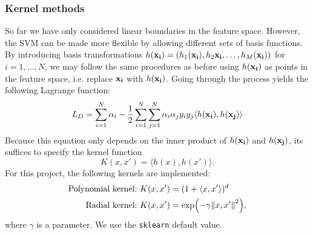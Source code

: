\documentclass[notitlepage, reprint, nofootinbib]{revtex4-1}
\begin{document}
\subsubsection{Kernel methods}
So far we have only considered linear boundaries in the feature space. However, the SVM can be made more flexible by allowing different sets of basis functions. By introducing basis transformations $h(\vb{x_i})=(h_1(\vb{x_i}), h_2\vb{x_i},\dots, h_M(\vb{x_i}))$ for $i=1,\dots,N$, we may follow the same procedures as before using $h(\vb{x_i})$ as points in the feature space, i.e. replace $\vb{x_i}$ with $h(\vb{x_i})$. Going through the process yields the following Lagrange function:
\begin{align}
	L_D =\sum_{i=1}^N\alpha_i - \frac{1}{2}\sum_{i=1}^N\sum_{j=1}^N \alpha_i\alpha_jy_iy_j \langle h(\vb{x_i}), h(\vb{x_j})\rangle
\end{align}
Because this equation only depends on the inner product of $h(\vb{x_i})$ and $h(\vb{x_j})$, its suffices to specify the kernel function
\begin{equation}K(x, x')=\langle h(x), h(x')\rangle. \end{equation} 
For this project, the following kernels are implemented: 
\begin{align}
	\text{Polynomial kernel:}\ &K(x, x') = (1+\langle x,x'\rangle )^d \\
	\text{Radial kernel:}\ &K(x, x') = \exp(-\gamma \norm{x, x'}^2),
\end{align}
where $\gamma$ is a parameter. We use the \texttt{sklearn} default value. 
\end{document}
